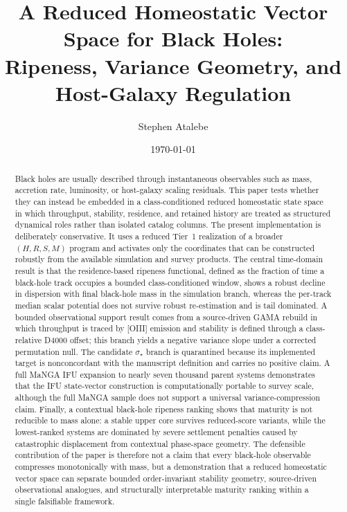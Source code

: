 \documentclass[11pt]{article}
\title{A Reduced Homeostatic Vector Space for Black Holes:\\Ripeness, Variance Geometry, and Host-Galaxy Regulation}
\author{Stephen Atalebe}
\date{\today}
\begin{document}
\maketitle

\begin{abstract}
Black holes are usually described through instantaneous observables such as mass, accretion rate, luminosity, or host-galaxy scaling residuals. This paper tests whether they can instead be embedded in a class-conditioned reduced homeostatic state space in which throughput, stability, residence, and retained history are treated as structured dynamical roles rather than isolated catalog columns. The present implementation is deliberately conservative. It uses a reduced Tier~1 realization of a broader $(H,R,S,M)$ program and activates only the coordinates that can be constructed robustly from the available simulation and survey products. The central time-domain result is that the residence-based ripeness functional, defined as the fraction of time a black-hole track occupies a bounded class-conditioned window, shows a robust decline in dispersion with final black-hole mass in the simulation branch, whereas the per-track median scalar potential does not survive robust re-estimation and is tail dominated. A bounded observational support result comes from a source-driven GAMA rebuild in which throughput is traced by [OIII] emission and stability is defined through a class-relative D4000 offset; this branch yields a negative variance slope under a corrected permutation null. The candidate $\sigma_\star$ branch is quarantined because its implemented target is nonconcordant with the manuscript definition and carries no positive claim. A full MaNGA IFU expansion to nearly seven thousand parent systems demonstrates that the IFU state-vector construction is computationally portable to survey scale, although the full MaNGA sample does not support a universal variance-compression claim. Finally, a contextual black-hole ripeness ranking shows that maturity is not reducible to mass alone: a stable upper core survives reduced-score variants, while the lowest-ranked systems are dominated by severe settlement penalties caused by catastrophic displacement from contextual phase-space geometry. The defensible contribution of the paper is therefore not a claim that every black-hole observable compresses monotonically with mass, but a demonstration that a reduced homeostatic vector space can separate bounded order-invariant stability geometry, source-driven observational analogues, and structurally interpretable maturity ranking within a single falsifiable framework.
\end{abstract}
\end{document}
